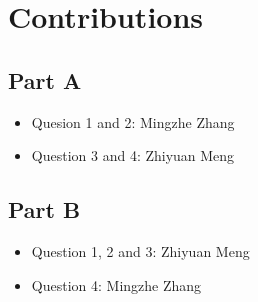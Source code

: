 \documentclass{article}
\begin{document}
\newpage

\section*{Contributions}

\subsection*{Part A}

\begin{itemize}
    \item Quesion 1 and 2: Mingzhe Zhang
    
    \item Question 3 and 4: Zhiyuan Meng
\end{itemize}

\subsection*{Part B}

\begin{itemize}
    \item Question 1, 2 and 3: Zhiyuan Meng
    
    \item Question 4: Mingzhe Zhang
\end{itemize}
\end{document}
